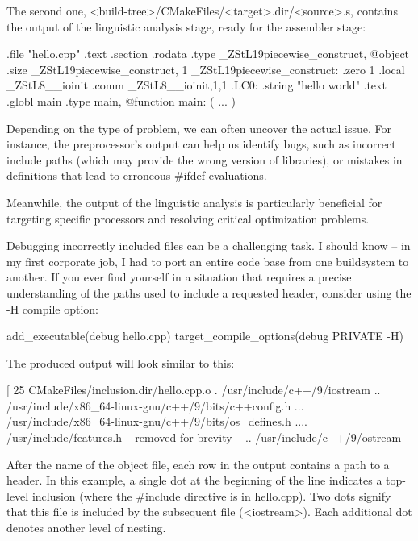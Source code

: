 The second one, <build-tree>/CMakeFiles/<target>.dir/<source>.s, contains the output of the linguistic analysis stage, ready for the assembler stage:

\begin{shell}
        .file "hello.cpp"
        .text
        .section .rodata
        .type _ZStL19piecewise_construct, @object
        .size _ZStL19piecewise_construct, 1
_ZStL19piecewise_construct:
        .zero 1
        .local _ZStL8__ioinit
        .comm _ZStL8__ioinit,1,1
.LC0:
        .string "hello world"
        .text
        .globl main
        .type main, @function
main:
( ... )
\end{shell}

Depending on the type of problem, we can often uncover the actual issue. For instance, the preprocessor’s output can help us identify bugs, such as incorrect include paths (which may provide the wrong version of libraries), or mistakes in definitions that lead to erroneous \#ifdef evaluations.

Meanwhile, the output of the linguistic analysis is particularly beneficial for targeting specific processors and resolving critical optimization problems.


Debugging incorrectly included files can be a challenging task. I should know – in my first corporate job, I had to port an entire code base from one buildsystem to another. If you ever find yourself in a situation that requires a precise understanding of the paths used to include a requested header, consider using the -H compile option:


\begin{cmake}
add_executable(debug hello.cpp)
target_compile_options(debug PRIVATE -H)
\end{cmake}

The produced output will look similar to this:

\begin{shell}
[ 25%
  CMakeFiles/inclusion.dir/hello.cpp.o
. /usr/include/c++/9/iostream
.. /usr/include/x86_64-linux-gnu/c++/9/bits/c++config.h
... /usr/include/x86_64-linux-gnu/c++/9/bits/os_defines.h
.... /usr/include/features.h
-- removed for brevity --
.. /usr/include/c++/9/ostream
\end{shell}

After the name of the object file, each row in the output contains a path to a header. In this example, a single dot at the beginning of the line indicates a top-level inclusion (where the \#include directive is in hello.cpp). Two dots signify that this file is included by the subsequent file (<iostream>).
Each additional dot denotes another level of nesting.

